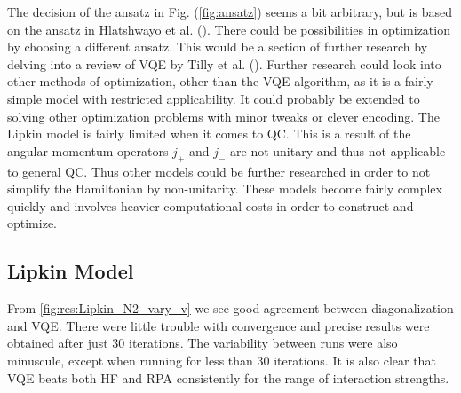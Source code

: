 The decision of the ansatz in Fig. (\ref{fig:ansatz}) seems a bit arbitrary, but is based on the ansatz in Hlatshwayo et al. (\cite{hlatshwayoSimulatingExcitedStates2022}). There could be possibilities in optimization by choosing a different ansatz. This would be a section of further research by delving into a review of VQE by Tilly et al. (\cite{VQE_review}). \newline 
Further research could look into other methods of optimization, other than the VQE algorithm, as it is a fairly simple model with restricted applicability. It could probably be extended to solving other optimization problems with minor tweaks or clever encoding. The Lipkin model is fairly limited when it comes to QC. This is a result of the angular momentum operators $j_+$ and $j_-$ are not unitary and thus not applicable to general QC. Thus other models could be further researched in order to not simplify the Hamiltonian by non-unitarity. These models become fairly complex quickly and involves heavier computational costs in order to construct and optimize.  

\subsection{Lipkin Model}
From \cref{fig:res:Lipkin_N2_vary_v} we see good agreement between diagonalization and VQE. There were little trouble with convergence and precise results were obtained after just 30 iterations. The variability between runs were also minuscule, except when running for less than 30 iterations. It is also clear that VQE beats both HF and RPA consistently for the range of interaction strengths. 


